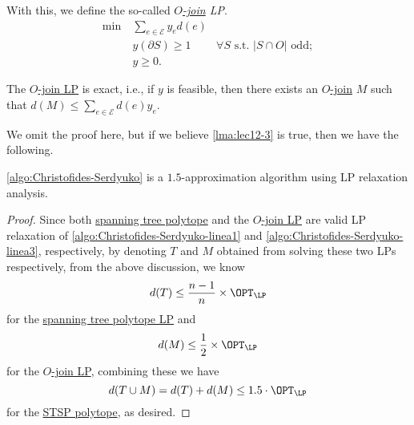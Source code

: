With this, we define the so-called \emph{\hyperref[def:O-join]{\(O\)-join} LP}.
\begin{equation}\label{eq:O-join-LP}
	\begin{aligned}
		\min~ & \sum_{e\in \mathcal{E} } y_e d(e)                                                                      \\
		      & y(\partial S) \geq 1              & \forall S\text{ s.t. }\left\vert S \cap O \right\vert \text{ odd}; \\
		      & y\geq 0.
	\end{aligned}
\end{equation}

\begin{lemma}\label{lma:lec12-3}
	The \hyperref[eq:O-join-LP]{\(O\)-join LP} is exact, i.e., if \(y\) is feasible, then there exists an \hyperref[def:O-join]{\(O\)-join} \(M\) such that \(d(M) \leq \sum_{e\in \mathcal{E} } d(e)y_e\).
\end{lemma}
We omit the proof here, but if we believe \autoref{lma:lec12-3} is true, then we have the following.

\begin{theorem}
	\autoref{algo:Christofides-Serdyuko} is a \(1.5\)-approximation algorithm using LP relaxation analysis.
\end{theorem}
\begin{proof}
	Since both \hyperref[eq:spanning-tree-polytope]{spanning tree polytope} and the \hyperref[eq:O-join-LP]{\(O\)-join LP} are valid LP relaxation of \autoref{algo:Christofides-Serdyuko-linea1} and \autoref{algo:Christofides-Serdyuko-linea3}, respectively, by denoting \(T\) and \(M\) obtained from solving these two LPs respectively, from the above discussion, we know
	\[
		d(T) \leq \frac{n-1}{n}\times \OPT_{\LP}
	\]
	for the \hyperref[eq:spanning-tree-polytope]{spanning tree polytope LP} and
	\[
		d(M) \leq \frac{1}{2}\times \OPT_{\LP }
	\]
	for the \hyperref[eq:O-join-LP]{\(O\)-join LP}, combining these we have
	\[
		d(T \cup M) = d(T) + d(M) \leq 1.5\cdot \OPT_{\LP }
	\]
	for the \hyperref[eq:STSP-polytope]{STSP polytope}, as desired.
\end{proof}